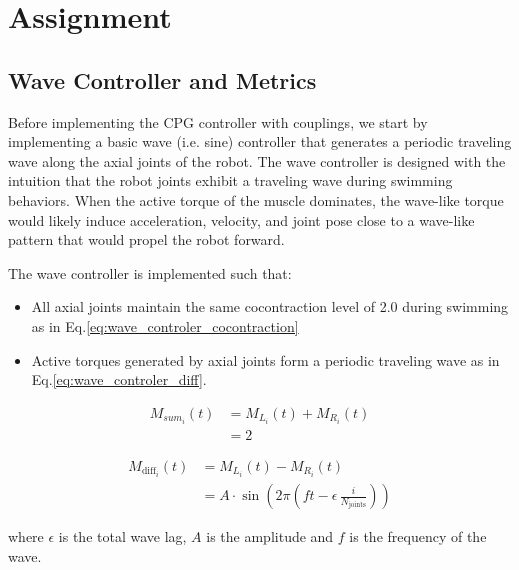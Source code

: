 \documentclass{cmc}
\begin{document}
\newpage


\newpage
\section {Assignment}

\subsection{Wave Controller and Metrics} \label{subsec:wavecontroller}
Before implementing the CPG controller with couplings, we start by implementing a basic wave (i.e. sine) controller that generates a periodic traveling wave along the axial joints of the robot. The wave controller is designed with the intuition that the robot joints exhibit a traveling wave during swimming behaviors. When the active torque of the muscle dominates, the wave-like torque would likely induce acceleration, velocity, and joint pose close to a wave-like pattern that would propel the robot forward.

The wave controller is implemented such that:
\begin{itemize}
    \item All axial joints maintain the same cocontraction level of 2.0 during swimming as in Eq.\ref{eq:wave_controler_cocontraction}
    \item Active torques generated by axial joints form a periodic traveling wave as in Eq.\ref{eq:wave_controler_diff}.
\end{itemize}


\begin{align}
\label{eq:wave_controler_cocontraction}
    M_{sum_i} (t) &= M_{L_i} (t) + M_{R_i} (t) \nonumber\\
    &= 2
\end{align}

\begin{align}
\label{eq:wave_controler_diff}
M_{\mathrm{diff}_i}(t)
  &= M_{L_i}(t) - M_{R_i}(t) \nonumber \\
  &= A \cdot \sin\!\left(
      2\pi \left(
        f t - \epsilon\,\frac{i}{N_{\mathrm{joints}}}
      \right)
    \right)
\end{align}

where $\epsilon$ is the total wave lag, $A$ is the amplitude and $f$ is the frequency of the wave.
\end{document}
